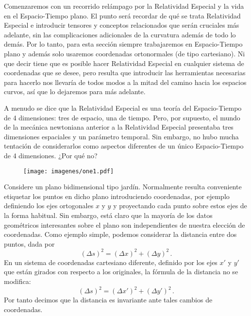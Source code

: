 \documentclass[11pt,b5paper,openany,twoside]{book}
\begin{document}
Comenzaremos con un recorrido relámpago por la Relatividad Especial y la vida en el Espacio-Tiempo plano.
El punto será recordar de qué se trata Relatividad Especial e introducir tensores y conceptos relacionados que serán cruciales más adelante, sin las complicaciones adicionales de la curvatura además de todo lo demás.
Por lo tanto, para esta sección siempre trabajaremos en Espacio-Tiempo plano y además solo usaremos coordenadas ortonormales (de tipo cartesiano).
Ni que decir tiene que es posible hacer Relatividad Especial en cualquier sistema de coordenadas que se desee, pero resulta que introducir las herramientas necesarias para hacerlo nos llevaría de todos modos a la mitad del camino hacia los espacios curvos, así que lo dejaremos para más adelante.

A menudo se dice que la Relatividad Especial es una teoría del Espacio-Tiempo de 4 dimensiones: tres de espacio, una de tiempo.
Pero, por supuesto, el mundo de la mecánica newtoniana anterior a la Relatividad Especial presentaba tres dimensiones espaciales y un parámetro temporal.
Sin embargo, no hubo mucha tentación de considerarlos como aspectos diferentes de un único Espacio-Tiempo de 4 dimensiones.
¿Por qué no?

\begin{figure}[h]
\centering
\texttt{[image: imagenes/one1.pdf]}
\end{figure}


Considere un plano bidimensional tipo jardín.
Normalmente resulta conveniente etiquetar los puntos en dicho plano introduciendo coordenadas, por ejemplo definiendo los ejes ortogonales $x$ y $y$ y proyectando cada punto sobre estos ejes de la forma habitual.
Sin embargo, está claro que la mayoría de los datos geométricos interesantes sobre el plano son independientes de nuestra elección de coordenadas.
Como ejemplo simple, podemos considerar la distancia entre dos puntos, dada por
\begin{equation}
(\Delta s)^2 = (\Delta x)^2 + (\Delta y)^2\,.\label{1.1}
\end{equation}
En un sistema de coordenadas cartesiano diferente, definido por los ejes $x'$ y $y'$ que están girados con respecto a los originales, la fórmula de la distancia no se modifica:
\begin{equation}
(\Delta s)^2 = (\Delta x')^2 + (\Delta y')^2\,.\label{1.2}
\end{equation}
Por tanto decimos que la distancia es invariante ante tales cambios de coordenadas.
\end{document}
